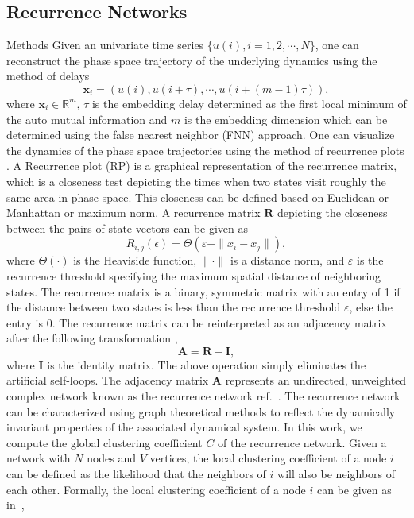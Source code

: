 \documentclass[letterpaper, 9pt, conference]{ieeeconf}
\begin{document}
\subsection{Recurrence Networks}
Methods
Given an univariate time series $\{u(i) , i = 1,2, \cdots ,N \}$, one can reconstruct the phase space trajectory of the underlying dynamics using the method of delays \cite{takens1981detecting}
\begin{equation}
\mathbf{x}_{i} = (u(i),u(i+\tau),\cdots,u(i+(m-1)\tau)),
\end{equation}
where $\mathbf{x}_{i} \in \mathbb{R}^m$, $\tau$ is the embedding delay determined as the first local minimum of the auto mutual information and $m$ is the embedding dimension which can be determined using the false nearest neighbor (FNN) approach. One can visualize the dynamics of the phase space trajectories using the method of recurrence plots \cite{eckmann1987recurrence}. A Recurrence plot (RP) is a graphical representation of the recurrence matrix, which is a closeness test depicting the times when two states visit roughly the same area in phase space. This closeness can be defined based on Euclidean or Manhattan or maximum norm. A recurrence matrix $\mathbf{R}$ depicting the closeness between the pairs of state vectors can be given as \cite{marwan2009complex,donner2010recurrence}
\begin{equation}
R_{i,j}(\epsilon)=\Theta(\varepsilon - \| x_{i}-x_{j}\|),
\end{equation}
where $\Theta(\cdot)$ is the Heaviside function, $\|\cdot\|$ is a distance norm, and $\varepsilon $ is the recurrence threshold specifying the maximum spatial distance of neighboring states. The recurrence matrix is a binary, symmetric matrix with an entry of 1 if the distance between two states is less than the recurrence threshold $\varepsilon$, else the entry is 0. The recurrence matrix can be reinterpreted as an adjacency matrix after the following transformation \cite{marwan2009complex,donner2010recurrence},
\begin{equation}
\mathbf{A} = \mathbf{R}-\mathbf{I},
\end{equation}
where $\mathbf{I}$ is the identity matrix. The above operation simply eliminates the artificial self-loops. The adjacency matrix $\mathbf{A}$ represents an undirected, unweighted complex network known as the recurrence network ref.~\cite{donner2010recurrence}. 
The recurrence network can be characterized using graph theoretical methods to reflect the dynamically invariant properties of the associated dynamical system. In this work, we compute the global clustering coefficient $C$ of the recurrence network. Given a network with $N$ nodes and $V$ vertices, the local clustering coefficient of a node $i$ can be defined as the likelihood that the neighbors of $i$ will also be neighbors of each other. Formally, the local clustering coefficient of a node $i$ can be given as in~\cite{watts1998collective},
\end{document}
